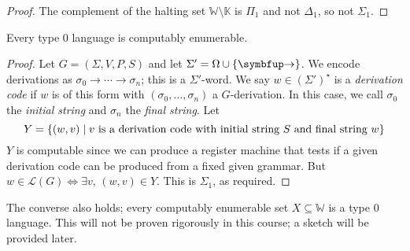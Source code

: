 \begin{proof}
	The complement of the halting set \( \mathbb W \setminus \mathbb K \) is \( \Pi_1 \) and not \( \Delta_1 \), so not \( \Sigma_1 \).
\end{proof}
\begin{theorem}
	Every type 0 language is computably enumerable.
\end{theorem}
\begin{proof}
	Let \( G = (\Sigma, V, P, S) \) and let \( \Sigma' = \Omega \cup \qty{\bm\to} \).
	We encode derivations as \( \sigma_0 \bm\to \cdots \bm\to \sigma_n \); this is a \( \Sigma' \)-word.
	We say \( w \in (\Sigma')^\star \) is a \emph{derivation code} if \( w \) is of this form with \( (\sigma_0, \dots, \sigma_n) \) a \( G \)-derivation.
	In this case, we call \( \sigma_0 \) the \emph{initial string} and \( \sigma_n \) the \emph{final string}.
	Let
	\[ Y = \qty{(w, v) \mid v \text{ is a derivation code with initial string } S \text{ and final string } w} \]
	\( Y \) is computable since we can produce a register machine that tests if a given derivation code can be produced from a fixed given grammar.
	But \( w \in \mathcal L(G) \iff \exists v,\, (w, v) \in Y \).
	This is \( \Sigma_1 \), as required.
\end{proof}
\begin{remark}
	The converse also holds; every computably enumerable set \( X \subseteq \mathbb W \) is a type 0 language.
	This will not be proven rigorously in this course; a sketch will be provided later.
\end{remark}


